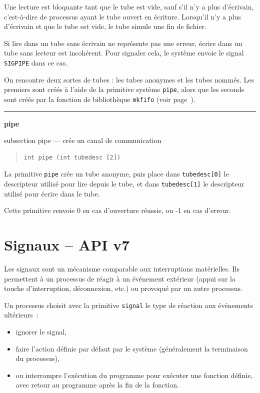 \documentclass [twoside] {report}
\newcommand {\primitive} [1]
    {
	\phantomsection
	{\large \textbf {#1}}
	\addcontentsline {toc} {subsection} {#1}
    }
\newcommand {\separation}
    {
	\vspace {5mm}
	\nopagebreak
	\hrule
    }
\begin{document}
Une lecture est bloquante tant que le tube est vide, sauf s'il n'y a
plus d'écrivain, c'est-à-dire de processus ayant le tube ouvert en
écriture. Lorsqu'il n'y a plus d'écrivain et que le tube est vide,
le tube simule une fin de fichier.

Si lire dans un tube sans écrivain ne représente pas une erreur,
écrire dans un tube sans lecteur est incohérent. Pour signaler
cela, le système envoie le signal \texttt {SIGPIPE} dans ce cas.

On rencontre deux sortes de tubes : les tubes anonymes et
les tubes nommés. Les premiers sont créés à l'aide de la
primitive système \texttt {pipe}, alors que les seconds sont créés par
la fonction de bibliothèque \texttt {mkfifo} (voir page~\pageref {mkfifo}).


\separation
\primitive {pipe} --- crée un canal de communication

\begin {quote}
\begin {verbatim}
int pipe (int tubedesc [2])
\end{verbatim}
\end {quote}

La primitive \texttt {pipe} crée un tube anonyme,
puis place dans \texttt {tubedesc[0]}
le descripteur utilisé pour lire depuis le tube, et dans
\texttt {tubedesc[1]} le descripteur utilisé pour écrire dans le tube.

Cette primitive renvoie 0 en cas d'ouverture
réussie, ou -1 en cas d'erreur.






\section {Signaux -- API v7}


Les signaux sont un mécanisme comparable aux interruptions
matérielles. Ils permettent à un processus de réagir à un
événement extérieur (appui sur la touche d'interruption,
déconnexion, etc.) ou provoqué par un autre processus.

Un processus choisit avec la primitive \texttt {signal}
le type de réaction aux événements ultérieurs~:

\begin {itemize}
    \item ignorer le signal,
    \item faire l'action définie par défaut par le
	système (généralement la terminaison du processus),
    \item ou interrompre l'exécution du programme pour exécuter
	une fonction définie, avec retour au programme après
	la fin de la fonction.
\end {itemize}
\end{document}

